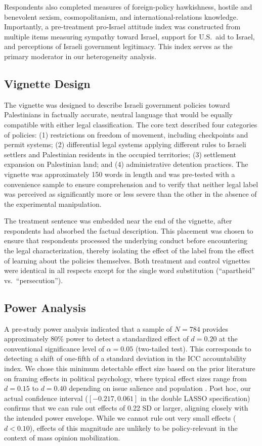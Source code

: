 \documentclass[12pt]{article}
\begin{document}
Respondents also completed measures of foreign-policy hawkishness, hostile and benevolent sexism, cosmopolitanism, and international-relations knowledge. Importantly, a pre-treatment pro-Israel attitude index was constructed from multiple items measuring sympathy toward Israel, support for U.S.\ aid to Israel, and perceptions of Israeli government legitimacy. This index serves as the primary moderator in our heterogeneity analysis.

\subsection{Vignette Design}

The vignette was designed to describe Israeli government policies toward Palestinians in factually accurate, neutral language that would be equally compatible with either legal classification. The core text described four categories of policies: (1) restrictions on freedom of movement, including checkpoints and permit systems; (2) differential legal systems applying different rules to Israeli settlers and Palestinian residents in the occupied territories; (3) settlement expansion on Palestinian land; and (4) administrative detention practices. The vignette was approximately 150 words in length and was pre-tested with a convenience sample to ensure comprehension and to verify that neither legal label was perceived as significantly more or less severe than the other in the absence of the experimental manipulation.

The treatment sentence was embedded near the end of the vignette, after respondents had absorbed the factual description. This placement was chosen to ensure that respondents processed the underlying conduct before encountering the legal characterization, thereby isolating the effect of the label from the effect of learning about the policies themselves. Both treatment and control vignettes were identical in all respects except for the single word substitution (``apartheid'' vs.\ ``persecution'').

\subsection{Power Analysis}

A pre-study power analysis indicated that a sample of $N = 784$ provides approximately 80\% power to detect a standardized effect of $d = 0.20$ at the conventional significance level of $\alpha = 0.05$ (two-tailed test). This corresponds to detecting a shift of one-fifth of a standard deviation in the ICC accountability index. We chose this minimum detectable effect size based on the prior literature on framing effects in political psychology, where typical effect sizes range from $d = 0.15$ to $d = 0.40$ depending on issue salience and population \citep{chong2007framing}. Post hoc, our actual confidence interval ($[-0.217, 0.061]$ in the double LASSO specification) confirms that we can rule out effects of 0.22 SD or larger, aligning closely with the intended power envelope. While we cannot rule out very small effects ($d < 0.10$), effects of this magnitude are unlikely to be policy-relevant in the context of mass opinion mobilization.
\end{document}
